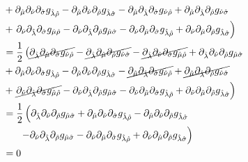 \documentclass[11pt]{article}
\numberwithin{equation}{section}
\begin{document}
\begin{enumerate}[(a)]
\begin{align*}
&+ \partial_{\hat{\mu}}\partial_{\hat{\nu}}\partial_{\hat{\sigma}}g_{\hat{\lambda}\hat{\rho}} - \partial_{\hat{\mu}}\partial_{\hat{\nu}}\partial_{\hat{\rho}}g_{\hat{\lambda}\hat{\sigma}} - \partial_{\hat{\mu}}\partial_{\hat{\lambda}}\partial_{\hat{\sigma}}g_{\hat{\nu}\hat{\rho}} + \partial_{\hat{\mu}}\partial_{\hat{\lambda}}\partial_{\hat{\rho}}g_{\hat{\nu}\hat{\sigma}}\\
&+ \left.\partial_{\hat{\nu}}\partial_{\hat{\lambda}}\partial_{\hat{\sigma}}g_{\hat{\mu}\hat{\rho}} - \partial_{\hat{\nu}}\partial_{\hat{\lambda}}\partial_{\hat{\rho}}g_{\hat{\mu}\hat{\sigma}} - \partial_{\hat{\nu}}\partial_{\hat{\mu}}\partial_{\hat{\sigma}}g_{\hat{\lambda}\hat{\rho}} + \partial_{\hat{\nu}}\partial_{\hat{\mu}}\partial_{\hat{\rho}}g_{\hat{\lambda}\hat{\sigma}}\right)\\
&= \frac{1}{2}\left(\cancel{\partial_{\hat{\lambda}}\partial_{\hat{\mu}}\partial_{\hat{\sigma}}g_{\hat{\nu}\hat{\rho}}} - \cancel{\partial_{\hat{\lambda}}\partial_{\hat{\mu}}\partial_{\hat{\rho}}g_{\hat{\nu}\hat{\sigma}}} - \cancel{\partial_{\hat{\lambda}}\partial_{\hat{\nu}}\partial_{\hat{\sigma}}g_{\hat{\mu}\hat{\rho}}} + \partial_{\hat{\lambda}}\partial_{\hat{\nu}}\partial_{\hat{\rho}}g_{\hat{\mu}\hat{\sigma}}\right.\\
&+ \partial_{\hat{\mu}}\partial_{\hat{\nu}}\partial_{\hat{\sigma}}g_{\hat{\lambda}\hat{\rho}} - \partial_{\hat{\mu}}\partial_{\hat{\nu}}\partial_{\hat{\rho}}g_{\hat{\lambda}\hat{\sigma}} - \cancel{\partial_{\hat{\mu}}\partial_{\hat{\lambda}}\partial_{\hat{\sigma}}g_{\hat{\nu}\hat{\rho}}} + \cancel{\partial_{\hat{\mu}}\partial_{\hat{\lambda}}\partial_{\hat{\rho}}g_{\hat{\nu}\hat{\sigma}}}\\
&+ \left.\cancel{\partial_{\hat{\nu}}\partial_{\hat{\lambda}}\partial_{\hat{\sigma}}g_{\hat{\mu}\hat{\rho}}} - \partial_{\hat{\nu}}\partial_{\hat{\lambda}}\partial_{\hat{\rho}}g_{\hat{\mu}\hat{\sigma}} - \partial_{\hat{\nu}}\partial_{\hat{\mu}}\partial_{\hat{\sigma}}g_{\hat{\lambda}\hat{\rho}} + \partial_{\hat{\nu}}\partial_{\hat{\mu}}\partial_{\hat{\rho}}g_{\hat{\lambda}\hat{\sigma}}\right)\\
&= \frac{1}{2}\left(\partial_{\hat{\lambda}}\partial_{\hat{\nu}}\partial_{\hat{\rho}}g_{\hat{\mu}\hat{\sigma}}+ \partial_{\hat{\mu}}\partial_{\hat{\nu}}\partial_{\hat{\sigma}}g_{\hat{\lambda}\hat{\rho}} - \partial_{\hat{\mu}}\partial_{\hat{\nu}}\partial_{\hat{\rho}}g_{\hat{\lambda}\hat{\sigma}}\right.\\
& \ \ \ \ \ \left. - \partial_{\hat{\nu}}\partial_{\hat{\lambda}}\partial_{\hat{\rho}}g_{\hat{\mu}\hat{\sigma}} - \partial_{\hat{\nu}}\partial_{\hat{\mu}}\partial_{\hat{\sigma}}g_{\hat{\lambda}\hat{\rho}} + \partial_{\hat{\nu}}\partial_{\hat{\mu}}\partial_{\hat{\rho}}g_{\hat{\lambda}\hat{\sigma}}\right)\\
&= 0
\end{align*}
\end{enumerate}
\end{document}
